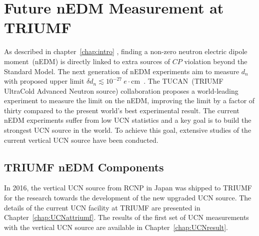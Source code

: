\chapter{Future nEDM Measurement at TRIUMF\label{chap:nedm}}

As described in chapter~\ref{chap:intro} , finding a non-zero neutron
electric dipole moment~(nEDM) is directly linked to extra sources of
$CP$ violation beyond the Standard Model.  The next generation of nEDM
experiments aim to measure $d_n$ with proposed upper limit
$\delta d_n\lesssim
10^{-27}~e\cdot$cm~\cite{serebrov2014new,serebrov2011supersource,Kirch_talk,baker2011search,altarev2012next,golub1994neutron,ito2007plans,picker2017minuscule}.
The TUCAN~(TRIUMF UltraCold Advanced Neutron source) collaboration
proposes a world-leading experiment to measure the limit on the nEDM,
improving the limit by a factor of thirty compared to the present
world’s best experimental result. The current nEDM experiments suffer
from low UCN statistics and a key goal is to build the strongest UCN
source in the world. To achieve this goal, extensive studies of the
current vertical UCN source have been conducted.



\section{TRIUMF nEDM Components~\label{sec:triumfnedm}}
In 2016, the vertical UCN source from RCNP in Japan was shipped to
TRIUMF for the research towards the development of the new upgraded
UCN source.  The details of the current UCN facility at TRIUMF are
presented in Chapter~\ref{chap:UCNattriumf}. The results of the first
set of UCN measurements with the vertical UCN source are available in
Chapter~\ref{chap:UCNresult}.




